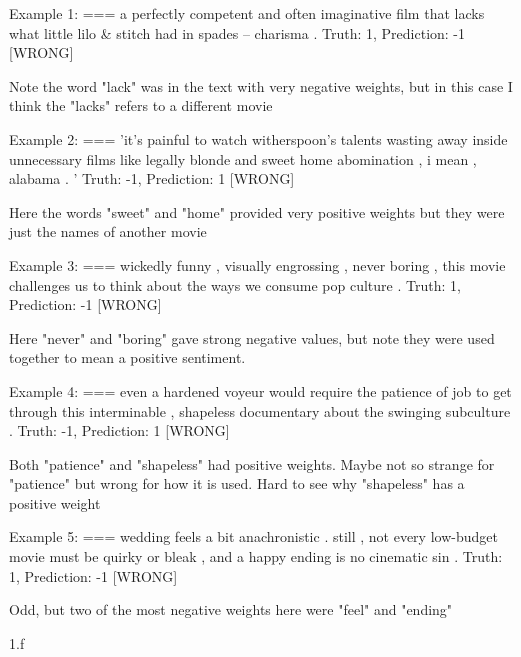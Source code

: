 \begin{answer}
  Example 1:
=== a perfectly competent and often imaginative film that lacks what little lilo \& stitch had in spades -- charisma .
Truth: 1, Prediction: -1 [WRONG]

Note the word "lack" was in the text with very negative weights, but in this case I think the "lacks" refers to a different movie


Example 2:
=== 'it's painful to watch witherspoon's talents wasting away inside unnecessary films like legally blonde and sweet home abomination , i mean , alabama . '
Truth: -1, Prediction: 1 [WRONG]


Here the words "sweet" and "home" provided very positive weights but they were just the names of another movie


Example 3:
=== wickedly funny , visually engrossing , never boring , this movie challenges us to think about the ways we consume pop culture .
Truth: 1, Prediction: -1 [WRONG]

Here "never" and "boring" gave strong negative values, but note they were used together to mean a positive sentiment.


Example 4:
=== even a hardened voyeur would require the patience of job to get through this interminable , shapeless documentary about the swinging subculture .
Truth: -1, Prediction: 1 [WRONG]

Both "patience" and "shapeless" had positive weights.  Maybe not so strange for "patience" but wrong for how it is used.
Hard to see why "shapeless" has a positive weight

Example 5:
=== wedding feels a bit anachronistic . still , not every low-budget movie must be quirky or bleak , and a happy ending is no cinematic sin .
Truth: 1, Prediction: -1 [WRONG]

Odd, but two of the most negative weights here were "feel" and "ending"

  
\end{answer}
\clearpage

\LARGE
1.f
\normalsize

